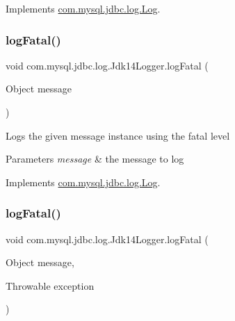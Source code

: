 Implements \mbox{\hyperlink{interfacecom_1_1mysql_1_1jdbc_1_1log_1_1_log_abca2e1258e8b1bca83fd13066e8930cd}{com.\+mysql.\+jdbc.\+log.\+Log}}.

\mbox{\label{classcom_1_1mysql_1_1jdbc_1_1log_1_1_jdk14_logger_a38b5dd14e2ef24972f6a7bda99231544}} 
\subsubsection{\texorpdfstring{log\+Fatal()}{logFatal()}\hspace{0.1cm}{\footnotesize\ttfamily [1/2]}}
{\footnotesize\ttfamily void com.\+mysql.\+jdbc.\+log.\+Jdk14\+Logger.\+log\+Fatal (\begin{DoxyParamCaption}\item[{Object}]{message }\end{DoxyParamCaption})}

Logs the given message instance using the \textquotesingle{}fatal\textquotesingle{} level


\begin{DoxyParams}{Parameters}
{\em message} & the message to log \\
\hline
\end{DoxyParams}


Implements \mbox{\hyperlink{interfacecom_1_1mysql_1_1jdbc_1_1log_1_1_log_a8d3b6b295ded6eaa1bfa50ffca6a4d28}{com.\+mysql.\+jdbc.\+log.\+Log}}.

\mbox{\label{classcom_1_1mysql_1_1jdbc_1_1log_1_1_jdk14_logger_adc559d153307c03a7d032eed1fbc092d}} 
\subsubsection{\texorpdfstring{log\+Fatal()}{logFatal()}\hspace{0.1cm}{\footnotesize\ttfamily [2/2]}}
{\footnotesize\ttfamily void com.\+mysql.\+jdbc.\+log.\+Jdk14\+Logger.\+log\+Fatal (\begin{DoxyParamCaption}\item[{Object}]{message,  }\item[{Throwable}]{exception }\end{DoxyParamCaption})}

